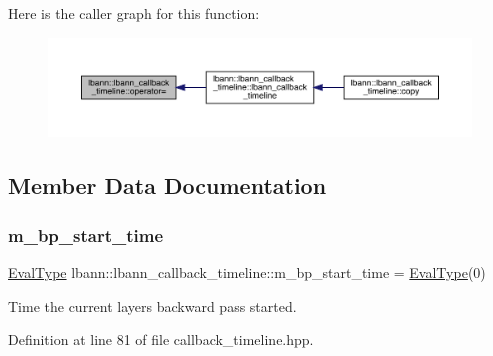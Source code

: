 Here is the caller graph for this function\+:\nopagebreak
\begin{figure}[H]
\begin{center}
\leavevmode
\includegraphics[width=350pt]{classlbann_1_1lbann__callback__timeline_a8469e5e1a36d8ed022b803a895baa6f8_icgraph}
\end{center}
\end{figure}


\subsection{Member Data Documentation}
\mbox{\label{classlbann_1_1lbann__callback__timeline_a7c4383231990d3a5fc8ec22a93784e15}} 
\subsubsection{\texorpdfstring{m\+\_\+bp\+\_\+start\+\_\+time}{m\_bp\_start\_time}}
{\footnotesize\ttfamily \hyperlink{base_8hpp_a3266f5ac18504bbadea983c109566867}{Eval\+Type} lbann\+::lbann\+\_\+callback\+\_\+timeline\+::m\+\_\+bp\+\_\+start\+\_\+time = \hyperlink{base_8hpp_a3266f5ac18504bbadea983c109566867}{Eval\+Type}(0)\hspace{0.3cm}{\ttfamily [private]}}



Time the current layer\textquotesingle{}s backward pass started. 



Definition at line 81 of file callback\+\_\+timeline.\+hpp.

\mbox{\label{classlbann_1_1lbann__callback__timeline_a59e63a11f33ed0cf3fd40dd2d8f91ede}} 
